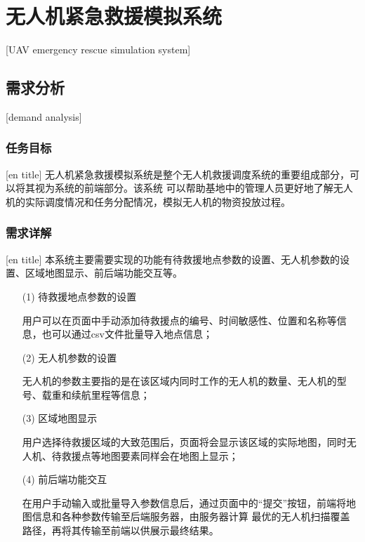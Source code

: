 
\chapter{无人机紧急救援模拟系统}[UAV emergency rescue simulation system]

\section{需求分析}[demand analysis]

\subsection{任务目标}[en title]
无人机紧急救援模拟系统是整个无人机救援调度系统的重要组成部分，可以将其视为系统的前端部分。该系统
可以帮助基地中的管理人员更好地了解无人机的实际调度情况和任务分配情况，模拟无人机的物资投放过程。
\subsection{需求详解}[en title]
本系统主要需要实现的功能有待救援地点参数的设置、无人机参数的设置、区域地图显示、前后端功能交互等。
\begin{itemize}
	\item [(1)] 待救援地点参数的设置


    \qquad 用户可以在页面中手动添加待救援点的编号、时间敏感性、位置和名称等信息，也可以通过csv文件批量导入地点信息；
    \item [(2)] 无人机参数的设置
    

    \qquad 无人机的参数主要指的是在该区域内同时工作的无人机的数量、无人机的型号、载重和续航里程等信息；
    \item [(3)] 区域地图显示
    

    \qquad 用户选择待救援区域的大致范围后，页面将会显示该区域的实际地图，同时无人机、待救援点等地图要素同样会在地图上显示；

    \item [(4)] 前后端功能交互
    

    \qquad 在用户手动输入或批量导入参数信息后，通过页面中的“提交”按钮，前端将地图信息和各种参数传输至后端服务器，由服务器计算
    最优的无人机扫描覆盖路径，再将其传输至前端以供展示最终结果。
\end{itemize}

